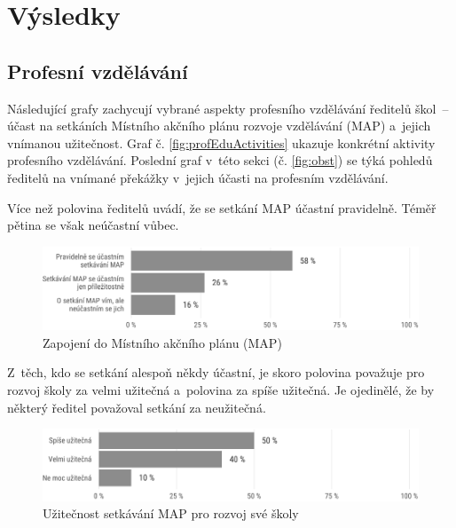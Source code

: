 \documentclass[12pt,a4paper,]{report}
\begin{document}
\hypertarget{vuxfdsledky}{%
\chapter{Výsledky}\label{vuxfdsledky}}

\hypertarget{profesnuxed-vzdux11bluxe1vuxe1nuxed}{%
\section{Profesní vzdělávání}\label{profesnuxed-vzdux11bluxe1vuxe1nuxed}}

Následující grafy zachycují vybrané aspekty profesního vzdělávání ředitelů škol~-- účast na setkáních Místního akčního plánu rozvoje vzdělávání (MAP) a~jejich vnímanou užitečnost. Graf č. \ref{fig:profEduActivities} ukazuje konkrétní aktivity profesního vzdělávání. Poslední graf v~této sekci (č. \ref{fig:obst}) se týká pohledů ředitelů na vnímané překážky v~jejich účasti na profesním vzdělávání.

Více než polovina ředitelů uvádí, že se setkání MAP účastní pravidelně. Téměř pětina se však neúčastní vůbec.

\begin{figure}

{\centering \includegraphics[width=\textwidth]{figs/map-1} 

}

\caption{Zapojení do Místního akčního plánu (MAP)}\label{fig:map}
\end{figure}

Z~těch, kdo se setkání alespoň někdy účastní, je skoro polovina považuje pro rozvoj školy za velmi užitečná a~polovina za spíše užitečná. Je ojedinělé, že by některý ředitel považoval setkání za neužitečná.

\begin{figure}

{\centering \includegraphics[width=\textwidth]{figs/unnamed-chunk-2-1} 

}

\caption{Užitečnost setkávání MAP pro rozvoj své školy}\label{fig:unnamed-chunk-2}
\end{figure}
\end{document}
